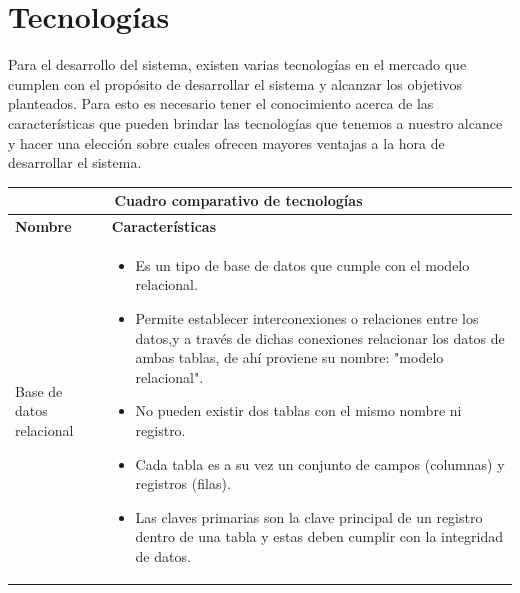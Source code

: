 \section{Tecnologías}
Para el desarrollo del sistema, existen varias tecnologías en el mercado que cumplen con el propósito de desarrollar el sistema y alcanzar los objetivos planteados. Para esto es necesario tener el conocimiento acerca de las características que pueden brindar las tecnologías que tenemos a nuestro alcance y hacer una elección sobre cuales ofrecen mayores ventajas a la hora de desarrollar el sistema.
\vspace{10mm}
	\begin{table}[b!]
    \centering
    \vspace{-30mm}
      \begin{tabular}{|p{2cm}|ll}
        \hline
        
        \multicolumn{2}{|c|}{{\bf Cuadro comparativo de tecnologías}} \\ 
        \hline
          \multicolumn{1}{|p{4cm}|}{{\bf Nombre}} & 
		  \multicolumn{1}{p{10cm}|}{{\bf Características}}\\

        \hline
          \multicolumn{1}{|p{5cm}|}{Base de datos relacional} & 
          \multicolumn{2}{p{10cm}|}{\begin{itemize}
          \vspace{-5mm}
        \item Es un tipo de base de datos que cumple con el modelo relacional.
        \item Permite establecer interconexiones o relaciones entre los datos,y a través de dichas conexiones relacionar los datos de ambas tablas, de ahí proviene su nombre: "modelo relacional".
        \item No pueden existir dos tablas con el mismo nombre ni registro.
        \item Cada tabla es a su vez un conjunto de campos (columnas) y registros (filas).
        \item Las claves primarias son la clave principal de un registro dentro de una tabla y estas deben cumplir con la integridad de datos.\cite{28}
       
      \end{itemize}} \\
         

\end{tabular}
\end{table}
